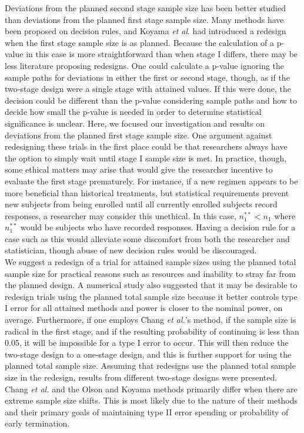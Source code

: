 \documentclass[12pt]{report}\usepackage[]{graphicx}\usepackage[]{color}
\newlength{\li}\setlength{\li}{14.48pt}
\newlength{\di}\setlength{\di}{-3.5mm}
\begin{document}
Deviations from the planned second stage sample size has been better studied than deviations from the planned first stage sample size. Many methods have been proposed on decision rules, and Koyama \textit{et al}. had introduced a redesign when the first stage sample size is as planned. Because the calculation of a p-value in this case is more straightforward than when stage I differs, there may be less literature proposing redesigns. One could calculate a p-value ignoring the sample paths for deviations in either the first or second stage, though, as if the two-stage design were a single stage with attained values. If this were done, the decision could be different than the p-value considering sample paths and how to decide how small the p-value is needed in order to determine statistical significance is unclear. Here, we focused our investigation and results on deviations from the planned first stage sample size. One argument against redesigning these trials in the first place could be that researchers always have the option to simply wait until stage I sample size is met. In practice, though, some ethical matters may arise that would give the researcher incentive to evaluate the first stage prematurely. For instance, if a new regimen appears to be more beneficial than historical treatments, but statistical requirements prevent new subjects from being enrolled until all currently enrolled subjects record responses, a researcher may consider this unethical. In this case, $n_1^{\ast\ast} < n_1$ where $n_1^{\ast\ast}$ would be subjects who have recorded responses. Having a decision rule for a case such as this would alleviate some discomfort from both the researcher and statistician, though abuse of new decision rules would be discouraged. \\
\indent We suggest a redesign of a trial for attained sample sizes using the planned total sample size for practical reasons such as resources and inability to stray far from the planned design. A numerical study also suggested that it may be desirable to redesign trials using the planned total sample size because it better controls type I error for all attained methods and power is closer to the nominal power, on average. Furthermore, if one employs Chang \textit{et al.}'s method, if the sample size is radical in the first stage, and if the resulting probability of continuing is less than 0.05, it will be impossible for a type I error to occur. This will then reduce the two-stage design to a one-stage design, and this is further support for using the planned total sample size.  Assuming that redesigns use the planned total sample size in the redesign, results from different two-stage designs were presented.  Chang \textit{et al.} and the Olson and Koyama methods primarily differ when there are extreme sample size shifts. This is most likely due to the nature of their methods and their primary goals of maintaining type II error spending or probability of early termination. \\
\end{document}
